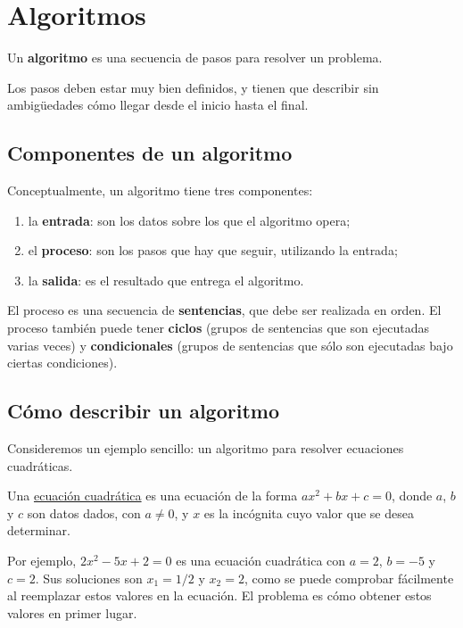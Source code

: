 \section{Algoritmos}

Un \textbf{algoritmo} es una secuencia de pasos para resolver un
problema.

Los pasos deben estar muy bien definidos, y tienen que describir sin
ambigüedades cómo llegar desde el inicio hasta el final.

\subsection{Componentes de un algoritmo}

Conceptualmente, un algoritmo tiene tres componentes:

\begin{enumerate}
\item
  la \textbf{entrada}: son los datos sobre los que el algoritmo opera;
\item
  el \textbf{proceso}: son los pasos que hay que seguir, utilizando la
  entrada;
\item
  la \textbf{salida}: es el resultado que entrega el algoritmo.
\end{enumerate}

El proceso es una secuencia de \textbf{sentencias}, que debe ser
realizada en orden. El proceso también puede tener \textbf{ciclos}
(grupos de sentencias que son ejecutadas varias veces) y
\textbf{condicionales} (grupos de sentencias que sólo son ejecutadas
bajo ciertas condiciones).

\subsection{Cómo describir un algoritmo}

Consideremos un ejemplo sencillo: un algoritmo para resolver ecuaciones
cuadráticas.

Una
\href{http://es.wikipedia.org/wiki/Ecuaci\%C3\%B3n\_de\_segundo\_grado}{ecuación
cuadrática} es una ecuación de la forma \(ax^2 + bx + c = 0\), donde
\(a\), \(b\) y \(c\) son datos dados, con \(a\ne 0\), y \(x\) es la incógnita cuyo
valor que se desea determinar.

Por ejemplo, \(2x^2 - 5x + 2 = 0\) es una ecuación cuadrática con \(a =
2\), \(b = -5\) y \(c = 2\). Sus soluciones son \(x_1 = 1/2\) y \(x_2 = 2\),
como se puede comprobar fácilmente al reemplazar estos valores en la
ecuación. El problema es cómo obtener estos valores en primer lugar.

